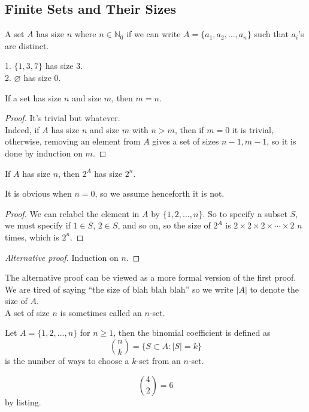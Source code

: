 \subsection{Finite Sets and Their Sizes}
\begin{definition}
    A set $A$ has size $n$ where $n\in\mathbb N_0$ if we can write $A=\{a_1,a_2,\ldots,a_n\}$ such that $a_i$'s are distinct.
\end{definition}
\begin{example}
    1. $\{1,3,7\}$ has size $3$.\\
    2. $\varnothing$ has size $0$.
\end{example}
\begin{proposition}
    If a set has size $n$ and size $m$, then $m=n$.
\end{proposition}
\begin{proof}
    It's trivial but whatever.\\
    Indeed, if $A$ has size $n$ and size $m$ with $n>m$, then if $m=0$ it is trivial, otherwise, removing an element from $A$ gives a set of sizes $n-1,m-1$, so it is done by induction on $m$.
\end{proof}
\begin{proposition}\label{2power}
    If $A$ has size $n$, then $2^A$ has size $2^n$.
\end{proposition}
It is obvious when $n=0$, so we assume henceforth it is not.
\begin{proof}
    We can relabel the element in $A$ by $\{1,2,\ldots,n\}$.
    So to specify a subset $S$, we must specify if $1\in S$, $2\in S$, and so on, so the size of $2^A$ is $2\times 2\times 2\times\cdots\times 2$ $n$ times, which is $2^n$.
\end{proof}
\begin{proof}[Alternative proof]
    Induction on $n$.
\end{proof}
The alternative proof can be viewed as a more formal version of the first proof.\\
We are tired of saying ``the size of blah blah blah'' so we write $|A|$ to denote the size of $A$.\\
A set of size $n$ is sometimes called an $n$-set.
\begin{definition}
    Let $A=\{1,2,\ldots,n\}$ for $n\ge 1$, then the binomial coefficient is defined as
    $$\binom{n}{k}=\{S\subset A:|S|=k\}$$
    is the number of ways to choose a $k$-set from an $n$-set.
\end{definition}
\begin{example}
    $$\binom{4}{2}=6$$
    by listing.
\end{example}
